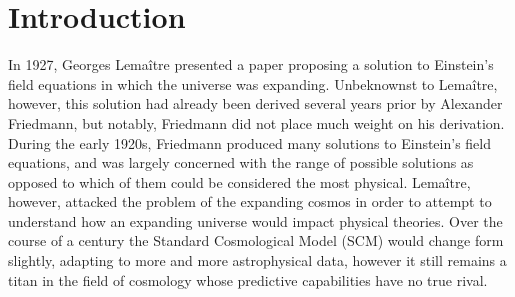\documentclass[a4paper]{article}
\begin{document}
    \section{\textbf{Introduction}}
    In 1927, Georges Lema\^{i}tre presented a paper proposing a solution to
    Einstein's field equations in which the universe was expanding.
    Unbeknownst to Lema\^{i}tre, however, this solution had already
    been derived several years prior by Alexander Friedmann, but notably,
    Friedmann did not place much weight on his derivation. During the early
    1920s, Friedmann produced many solutions to Einstein's field
    equations, and was largely concerned with the range of possible solutions
    as opposed to which of them could be considered the most physical.
    Lema\^{i}tre, however, attacked the problem of the expanding cosmos in
    order to attempt to understand how an expanding universe would impact
    physical theories. 
    Over the course of a century the Standard Cosmological Model (SCM) would
    change form slightly, adapting to more and more astrophysical data, however
    it still remains a titan in the field of cosmology whose predictive
    capabilities have no true rival.
    
    
\end{document}
